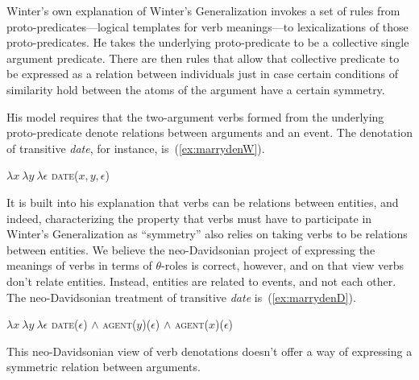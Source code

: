 \documentclass[twoside, 12pt]{article}
\begin{document}
Winter's own explanation of Winter's Generalization invokes a set of rules from proto-predicates---logical templates for verb meanings---to lexicalizations of those proto-predicates. He takes the underlying proto-predicate to be a collective single argument predicate. There are then rules that allow that collective predicate to be expressed as a relation between individuals just in case certain conditions of similarity hold between the atoms of the argument have a certain symmetry. 

His model requires that the two-argument verbs formed from the underlying proto-predicate denote relations between arguments and an event. The denotation of transitive \textit{date}, for instance, is~(\ref{ex:marrydenW}).
\begin{exe}
\raggedright
  \ex \label{ex:marrydenW} $\lambda x\ \lambda y\ \lambda \epsilon$ \textsc{date}($x,y,\epsilon$)
\end{exe}
It is built into his explanation that verbs can be relations between entities, and indeed, characterizing the property that verbs must have to participate in Winter's Generalization as ``symmetry'' also relies on taking verbs to be relations between entities. We believe the neo-Davidsonian project of expressing the meanings of verbs in terms of $\theta$-roles is correct, however, and on that view verbs don't relate entities. Instead, entities are related to events, and not each other. The neo-Davidsonian treatment of transitive \textit{date} is~(\ref{ex:marrydenD}).
\begin{exe}
\raggedright
  \ex \label{ex:marrydenD} $\lambda x\ \lambda y\ \lambda \epsilon$ \textsc{date}($\epsilon$) $\wedge$ \textsc{agent}($y$)($\epsilon$) $\wedge$ \textsc{agent}($x$)($\epsilon$)
\end{exe}
This neo-Davidsonian view of verb denotations doesn't offer a way of expressing a symmetric relation between arguments. 
\end{document}
